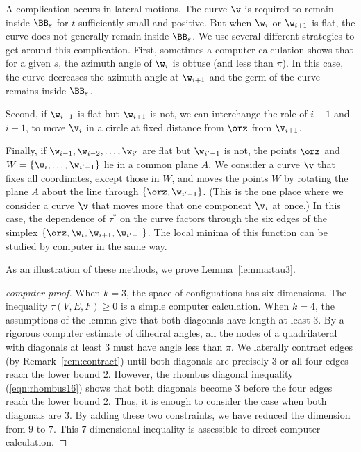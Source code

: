 \begin{remark}
A complication occurs in lateral motions.  The curve $\v$ is required
to remain inside $\BB_s$ for $t$ sufficiently small and positive.  But
when $\w_i$ or $\w_{i+1}$ is flat, the curve does not generally remain
inside $\BB_s$.  We use several different strategies to get around
this complication.  First, sometimes a computer calculation shows that
for a given $s$, the azimuth angle of $\w_i$ is obtuse (and less than
$\pi$).  In this case, the curve decreases the azimuth angle at
$\w_{i+1}$ and the germ of the curve remains inside $\BB_s$.

Second, if $\w_{i-1}$ is flat but $\w_{i+1}$ is not, we can
interchange the role of $i-1$ and $i+1$, to move $\v_i$ in a circle at
fixed distance from $\orz$ from $\v_{i+1}$.

Finally, if $\w_{i-1},\w_{i-2},\ldots,\w_{i'}$ are flat but
$\w_{i'-1}$ is not, the points $\orz$ and
$W=\{\w_{i},\ldots,\w_{i'-1}\}$ lie in a common plane $A$.  We
consider a curve $\v$ that fixes all coordinates, except those in $W$,
and moves the points $W$ by rotating the plane $A$ about the line
through $\{\orz,\w_{i'-1}\}$.  (This is the one place where we
consider a curve $\v$ that moves more that one component $\v_i$ at
once.)  In this case, the dependence of $\tau^*$ on the curve factors
through the six edges of the simplex
$\{\orz,\w_i,\w_{i+1},\w_{i'-1}\}$.  The local minima of this function
can be studied by computer in the same way.
\end{remark}

As an illustration of these methods, we prove Lemma~\ref{lemma:tau3}.

\begin{proof}[computer proof]
  When $k=3$, the space of configuations has six dimensions.  The
  inequality $\tau(V,E,F)\ge0$ is a simple computer calculation.  When
  $k=4$, the assumptions of the lemma give that both diagonals have
  length at least $3$.  By a rigorous computer estimate of dihedral
  angles, all the nodes of a quadrilateral with diagonals at least $3$
  must have angle less than $\pi$.  We laterally contract edges (by
  Remark~\ref{rem:contract}) until both diagonals are precisely $3$ or
  all four edges reach the lower bound $2$.  However, the rhombus
  diagonal inequality (\ref{eqn:rhombus16}) shows that both diagonals
  become $3$ before the four edges reach the lower bound $2$.  Thus,
  it is enough to consider the case when both diagonals are $3$.  By
  adding these two constraints, we have reduced the dimension from $9$
  to $7$. This $7$-dimensional inequality is assessible to direct
  computer calculation.
\end{proof}

